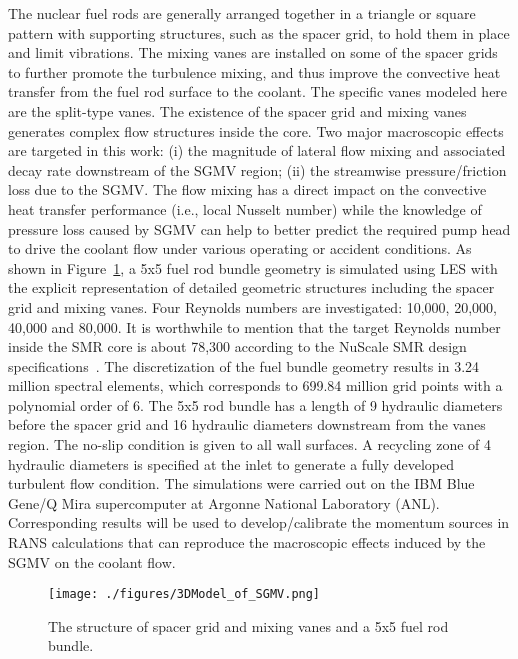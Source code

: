 The nuclear fuel rods are generally arranged together in a triangle or square pattern with supporting structures, such as the spacer grid, to hold them in place and limit vibrations.
The mixing vanes are installed on some of the spacer grids to further promote the turbulence mixing, and thus improve the convective heat transfer from the fuel rod surface to the coolant.
The specific vanes modeled here are the split-type vanes.
The existence of the spacer grid and mixing vanes generates complex flow structures inside the core. Two major macroscopic effects are targeted in this work:
(i) the magnitude of lateral flow mixing and associated decay rate downstream of the SGMV region;
(ii) the streamwise pressure/friction loss due to the SGMV.
The flow mixing has a direct impact on the convective heat transfer performance (i.e., local Nusselt number) while the knowledge of pressure loss caused by SGMV can help to better predict the required pump head to drive the coolant flow under various operating or accident conditions.
As shown in Figure~\ref{fig:sgmvcad}, a 5x5 fuel rod bundle geometry is simulated using LES with the explicit representation of detailed geometric structures including the spacer grid and mixing vanes.
Four Reynolds numbers are investigated: 10,000, 20,000, 40,000 and 80,000. It is worthwhile to mention that the target Reynolds number inside the SMR core is about 78,300 according to the NuScale SMR design specifications~\citep{NuScale2018,Romano2020}. 
The discretization of the fuel bundle geometry results in 3.24 million spectral elements, which corresponds to 699.84 million grid points with a polynomial order of 6. The 5x5 rod bundle has a length of 9 hydraulic diameters before the spacer grid and 16 hydraulic diameters downstream from the vanes region. The no-slip condition is given to all wall surfaces.
A recycling zone of 4 hydraulic diameters is specified at the inlet to generate a fully developed turbulent flow condition.  
The simulations were carried out on the IBM Blue Gene/Q Mira supercomputer at Argonne National Laboratory (ANL).
Corresponding results will be used to develop/calibrate the momentum sources in RANS calculations that can reproduce the macroscopic effects induced by the SGMV on the coolant flow.

\begin{figure}[!ht]
\centering
\texttt{[image: ./figures/3DModel\_of\_SGMV.png]}
\caption{The structure of spacer grid and mixing vanes and a 5x5 fuel rod bundle. }
\label{fig:sgmvcad}
\end{figure}

